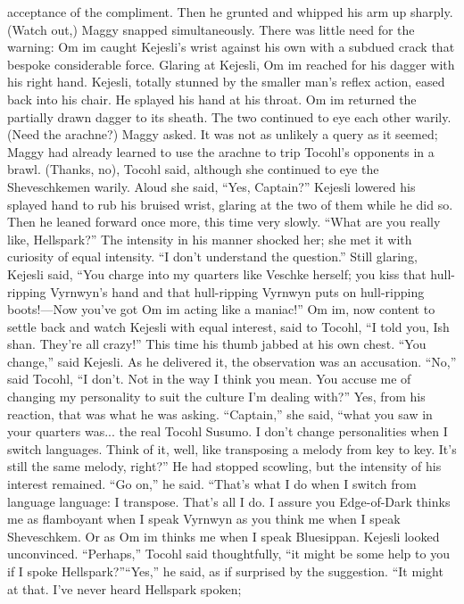 \documentclass[9pt]{article}
\begin{document}
acceptance of the compliment. Then he grunted and whipped his arm up sharply. (Watch out,) Maggy
snapped simultaneously.
There was little need for the warning: Om im caught Kejesli’s wrist against his own with a subdued
crack that bespoke considerable force. Glaring at Kejesli, Om im reached for his dagger with his right
hand.
Kejesli, totally stunned by the smaller man’s reflex action, eased back into his chair. He splayed his
hand at his throat. Om im returned the partially drawn dagger to its sheath.
The two continued to eye each other warily.
(Need the arachne?) Maggy asked. It was not as unlikely a query as it seemed; Maggy had already
learned to use the arachne to trip Tocohl’s opponents in a brawl.
(Thanks, no), Tocohl said, although she continued to eye the Sheveschkemen warily. Aloud she said,
“Yes, Captain?”
Kejesli lowered his splayed hand to rub his bruised wrist, glaring at the two of them while he did so.
Then he leaned forward once more, this time very slowly. “What are you really like, Hellspark?”
The intensity in his manner shocked her; she met it with curiosity of equal intensity. “I don’t
understand the question.”
Still glaring, Kejesli said, “You charge into my quarters like Veschke herself; you kiss that hull-ripping
Vyrnwyn’s hand and that hull-ripping Vyrnwyn puts on hull-ripping boots!—Now you’ve got Om im
acting like a maniac!”
Om im, now content to settle back and watch Kejesli with equal interest, said to Tocohl, “I told you,
Ish shan. They’re all crazy!” This time his thumb jabbed at his own chest.
“You change,” said Kejesli. As he delivered it, the observation was an accusation.
“No,” said Tocohl, “I don’t. Not in the way I think you mean. You accuse me of changing my
personality to suit the culture I’m dealing with?” Yes, from his reaction, that was what he was asking.
“Captain,” she said, “what you saw in your quarters was... the real Tocohl Susumo. I don’t change
personalities when I switch languages. Think of it, well, like transposing a melody from key to key. It’s
still the same melody, right?”
He had stopped scowling, but the intensity of his interest remained. “Go on,” he said.
“That’s what I do when I switch from language language: I transpose. That’s all I do. I assure you
Edge-of-Dark thinks me as flamboyant when I speak Vyrnwyn as you think me when I speak
Sheveschkem. Or as Om im thinks me when I speak Bluesippan.
Kejesli looked unconvinced.
“Perhaps,” Tocohl said thoughtfully, “it might be some help to you if I spoke Hellspark?”“Yes,” he said, as if surprised by the suggestion. “It might at that. I’ve never heard Hellspark spoken;
\end{document}
